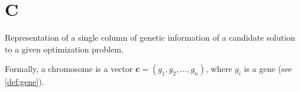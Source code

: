 \section*{C}
  \begin{definition}[Chromosome]
  \label{def:chromosome}
    Representation of a single column of genetic information of a candidate solution to a given
    optimization problem.

    Formally, a chromosome is a vector \(\textbf{c} = (g_1, g_2, \dots, g_n)\), where \(g_i\) is a
    gene (see \vref{def:gene}).
  \end{definition}